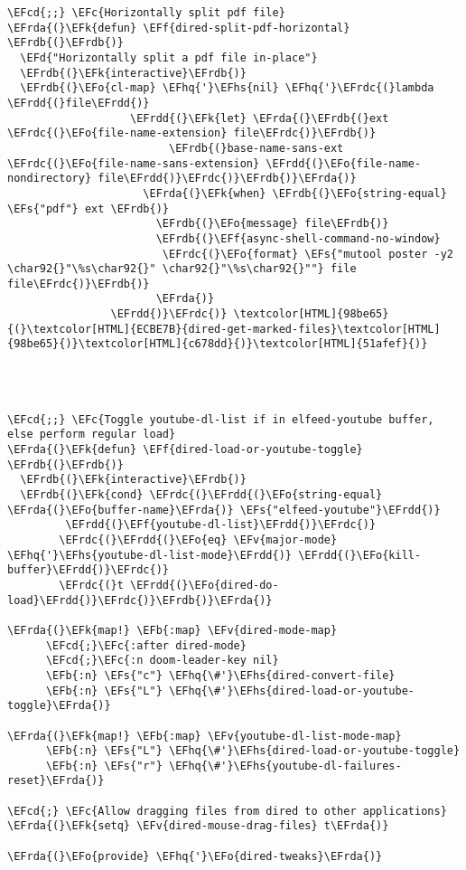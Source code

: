 \documentclass[a4wide,10pt]{article}
\newcommand{\EFc}[1]{\textcolor{EFc}{#1}} %
\newcommand{\EFcd}[1]{\textcolor{EFcd}{#1}} %
\newcommand{\EFs}[1]{\textcolor{EFs}{#1}} %
\newcommand{\EFd}[1]{\textcolor{EFd}{#1}} %
\newcommand{\EFk}[1]{\textcolor{EFk}{#1}} %
\newcommand{\EFb}[1]{\textcolor{EFb}{#1}} %
\newcommand{\EFf}[1]{\textcolor{EFf}{#1}} %
\newcommand{\EFv}[1]{\textcolor{EFv}{#1}} %
\newcommand{\EFo}[1]{\textcolor{EFo}{#1}} %
\newcommand{\EFhq}[1]{\textcolor{EFhq}{#1}} %
\newcommand{\EFhs}[1]{\textcolor{EFhs}{#1}} %
\newcommand{\EFrda}[1]{\textcolor{EFrda}{#1}} %
\newcommand{\EFrdb}[1]{\textcolor{EFrdb}{#1}} %
\newcommand{\EFrdc}[1]{\textcolor{EFrdc}{#1}} %
\newcommand{\EFrdd}[1]{\textcolor{EFrdd}{#1}} %
\begin{document}
\begin{Code}
\begin{Verbatim}
\EFcd{;;} \EFc{Horizontally split pdf file}
\EFrda{(}\EFk{defun} \EFf{dired-split-pdf-horizontal} \EFrdb{(}\EFrdb{)}
  \EFd{"Horizontally split a pdf file in-place"}
  \EFrdb{(}\EFk{interactive}\EFrdb{)}
  \EFrdb{(}\EFo{cl-map} \EFhq{'}\EFhs{nil} \EFhq{'}\EFrdc{(}lambda \EFrdd{(}file\EFrdd{)}
                   \EFrdd{(}\EFk{let} \EFrda{(}\EFrdb{(}ext \EFrdc{(}\EFo{file-name-extension} file\EFrdc{)}\EFrdb{)}
                         \EFrdb{(}base-name-sans-ext \EFrdc{(}\EFo{file-name-sans-extension} \EFrdd{(}\EFo{file-name-nondirectory} file\EFrdd{)}\EFrdc{)}\EFrdb{)}\EFrda{)}
                     \EFrda{(}\EFk{when} \EFrdb{(}\EFo{string-equal} \EFs{"pdf"} ext \EFrdb{)}
                       \EFrdb{(}\EFo{message} file\EFrdb{)}
                       \EFrdb{(}\EFf{async-shell-command-no-window}
                        \EFrdc{(}\EFo{format} \EFs{"mutool poster -y2 \char92{}"\%s\char92{}" \char92{}"\%s\char92{}""} file file\EFrdc{)}\EFrdb{)}
                       \EFrda{)}
                \EFrdd{)}\EFrdc{)} \textcolor[HTML]{98be65}{(}\textcolor[HTML]{ECBE7B}{dired-get-marked-files}\textcolor[HTML]{98be65}{)}\textcolor[HTML]{c678dd}{)}\textcolor[HTML]{51afef}{)}




\EFcd{;;} \EFc{Toggle youtube-dl-list if in elfeed-youtube buffer, else perform regular load}
\EFrda{(}\EFk{defun} \EFf{dired-load-or-youtube-toggle} \EFrdb{(}\EFrdb{)}
  \EFrdb{(}\EFk{interactive}\EFrdb{)}
  \EFrdb{(}\EFk{cond} \EFrdc{(}\EFrdd{(}\EFo{string-equal} \EFrda{(}\EFo{buffer-name}\EFrda{)} \EFs{"elfeed-youtube"}\EFrdd{)}
         \EFrdd{(}\EFf{youtube-dl-list}\EFrdd{)}\EFrdc{)}
        \EFrdc{(}\EFrdd{(}\EFo{eq} \EFv{major-mode} \EFhq{'}\EFhs{youtube-dl-list-mode}\EFrdd{)} \EFrdd{(}\EFo{kill-buffer}\EFrdd{)}\EFrdc{)}
        \EFrdc{(}t \EFrdd{(}\EFo{dired-do-load}\EFrdd{)}\EFrdc{)}\EFrdb{)}\EFrda{)}

\EFrda{(}\EFk{map!} \EFb{:map} \EFv{dired-mode-map}
      \EFcd{;}\EFc{:after dired-mode}
      \EFcd{;}\EFc{:n doom-leader-key nil}
      \EFb{:n} \EFs{"c"} \EFhq{\#'}\EFhs{dired-convert-file}
      \EFb{:n} \EFs{"L"} \EFhq{\#'}\EFhs{dired-load-or-youtube-toggle}\EFrda{)}

\EFrda{(}\EFk{map!} \EFb{:map} \EFv{youtube-dl-list-mode-map}
      \EFb{:n} \EFs{"L"} \EFhq{\#'}\EFhs{dired-load-or-youtube-toggle}
      \EFb{:n} \EFs{"r"} \EFhq{\#'}\EFhs{youtube-dl-failures-reset}\EFrda{)}

\EFcd{;} \EFc{Allow dragging files from dired to other applications}
\EFrda{(}\EFk{setq} \EFv{dired-mouse-drag-files} t\EFrda{)}

\EFrda{(}\EFo{provide} \EFhq{'}\EFo{dired-tweaks}\EFrda{)}
\end{Verbatim}
\end{Code}
\end{document}
